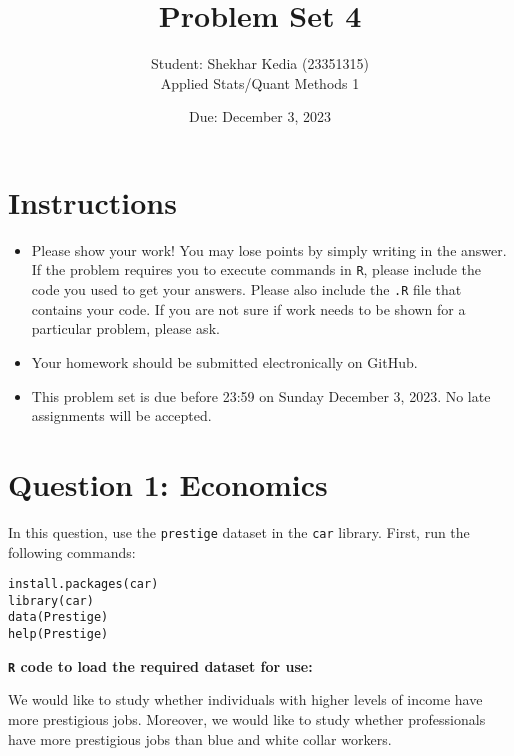 \documentclass[12pt,letterpaper]{article}
\title{Problem Set 4}
\date{Due: December 3, 2023}
\author{Student: Shekhar Kedia (23351315)\\
	Applied Stats/Quant Methods 1}
\begin{document}
	\maketitle
	\section*{Instructions}
	\begin{itemize}
		\item Please show your work! You may lose points by simply writing in the answer. If the problem requires you to execute commands in \texttt{R}, please include the code you used to get your answers. Please also include the \texttt{.R} file that contains your code. If you are not sure if work needs to be shown for a particular problem, please ask.
		\item Your homework should be submitted electronically on GitHub.
		\item This problem set is due before 23:59 on Sunday December 3, 2023. No late assignments will be accepted.
	\end{itemize}



	\vspace{.5cm}
\section*{Question 1: Economics}
\vspace{.25cm}
\noindent 	
In this question, use the \texttt{prestige} dataset in the \texttt{car} library. First, run the following commands:

\begin{verbatim}
install.packages(car)
library(car)
data(Prestige)
help(Prestige)
\end{verbatim} 

\noindent\textbf{\texttt{R} code to load the required dataset for use:}


\noindent We would like to study whether individuals with higher levels of income have more prestigious jobs. Moreover, we would like to study whether professionals have more prestigious jobs than blue and white collar workers.
\end{document}

